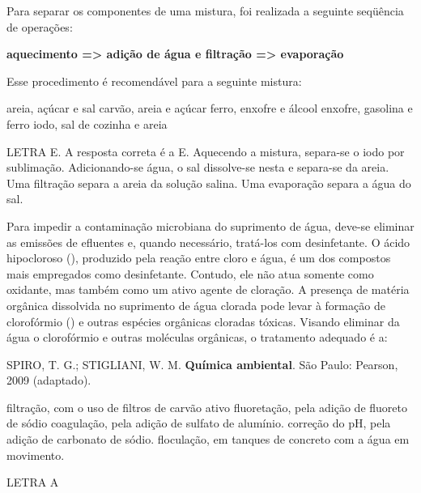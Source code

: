 \documentclass[9 pt]{scrartcl}
\def\PQ{0.84} %
\begin{document}
\begin{exercise}[points=\PQ]
Para separar os componentes de uma mistura, foi realizada a seguinte seqüência de operações:

\textbf{aquecimento  =>  adição de água e filtração  =>  evaporação}

Esse procedimento é recomendável para a seguinte mistura:
\begin{choice}
\choice  areia, açúcar e sal
\choice  carvão, areia e açúcar
\choice  ferro, enxofre e álcool
\choice  enxofre, gasolina e ferro
\choice iodo, sal de cozinha e areia
\end{choice}
\end{exercise}
\begin{solution}
LETRA E. A resposta correta é a E. Aquecendo a mistura, separa-se o iodo por sublimação. Adicionando-se água, o sal dissolve-se nesta e separa-se da areia. Uma filtração separa a areia da solução salina. Uma evaporação separa a água do sal.
\end{solution}



\begin{exercise}[points=\PQ]
Para impedir a contaminação microbiana do suprimento de água, deve-se eliminar as emissões de efluentes e, quando necessário, tratá-los com desinfetante. O ácido hipocloroso (), produzido pela reação entre cloro e água, é um dos compostos mais empregados como desinfetante. Contudo, ele não atua somente como oxidante, mas também como um ativo agente de cloração. A presença de matéria orgânica dissolvida no suprimento de água clorada pode levar à formação de clorofórmio () e outras espécies orgânicas cloradas tóxicas.
Visando eliminar da água o clorofórmio e outras moléculas orgânicas, o tratamento adequado é a:

 {\scriptsize SPIRO, T. G.; STIGLIANI, W. M. {\bfseries Química ambiental}. São Paulo: Pearson, 2009 (adaptado).} 

\begin{choice}
\choice filtração, com o uso de filtros de carvão ativo
\choice fluoretação, pela adição de fluoreto de sódio
\choice coagulação, pela adição de sulfato de alumínio.
\choice correção do pH, pela adição de carbonato de sódio.
\choice floculação, em tanques de concreto com a água em movimento.
\end{choice}
\end{exercise}
\begin{solution}
LETRA A
\end{solution}
\end{document}
